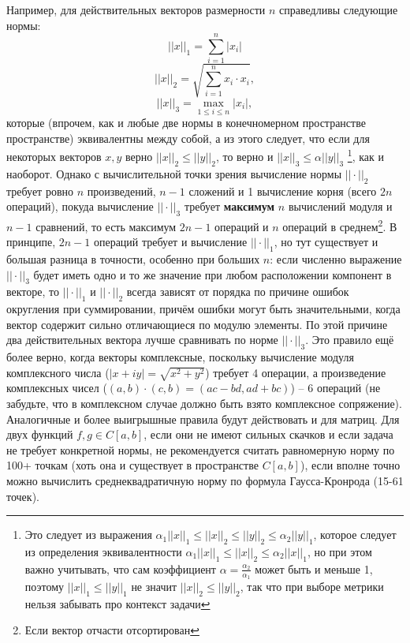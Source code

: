 \documentclass[a4paper, 12pt]{article}
\begin{document}
Например, для действительных векторов размерности $n$ справедливы следующие нормы:
\begin{equation}
    ||x||_1=\sum_{i=1}^n |x_i|
\end{equation}
\begin{equation}
    ||x||_2=\sqrt{\sum_{i=1}^n x_i \cdot x_i},  
\end{equation}
\begin{equation}
    ||x||_3=\max_{1\leq i \leq n} |x_i|,
\end{equation}
которые (впрочем, как и любые две нормы в конечномерном пространстве пространстве) эквивалентны между собой, а из этого следует, что если для некоторых векторов $x,y$ верно $||x||_2 \leq ||y||_2$, то верно и $||x||_3 \leq \alpha ||y||_3$ \footnote{Это следует из выражения $\alpha_1 ||x||_1 \leq ||x||_2\leq||y||_2\leq \alpha_2 ||y||_1$, которое следует из определения эквивалентности $\alpha_1 ||x||_1 \leq ||x||_2\leq \alpha_2 ||x||_1$, но при этом важно учитывать, что сам коэффициент $\alpha=\frac{\alpha_2}{\alpha_1}$ может быть и меньше 1, поэтому $||x||_1\leq ||y||_1$ не значит $||x||_2\leq ||y||_2$, так что при выборе метрики нельзя забывать про контекст задачи}, как и наоборот.
Однако с вычислительной точки зрения вычисление нормы $||\cdot||_2$ требует ровно $n$ произведений, $n-1$ сложений и 1 вычисление корня (всего $2n$ операций), покуда вычисление $||\cdot||_3$ требует {\bf максимум} $n$ вычислений модуля и $n-1$ сравнений, то есть максимум $2n-1$ операций и $n$ операций в среднем\footnote{Если вектор отчасти отсортирован}. В принципе, $2n-1$ операций требует и вычисление $||\cdot||_1$, но тут существует и большая разница в точности, особенно при больших $n$: если численно выражение $||\cdot||_3$ будет иметь одно и то же значение при любом расположении компонент в векторе, то $||\cdot||_1$ и $||\cdot||_2$ всегда зависят от порядка по причине ошибок округления при суммировании, причём ошибки могут быть значительными, когда вектор содержит сильно отличающиеся по модулю элементы. По этой причине два действительных вектора лучше сравнивать по норме $||\cdot||_3$.
Это правило ещё более верно, когда векторы комплексные, поскольку вычисление модуля комплексного числа ($|x+iy|=\sqrt{x^2+y^2}$) требует 4 операции, а произведение комплексных чисел ($(a,b)\cdot(c,b)=(ac-bd,ad+bc)$) -- 6 операций (не забудьте, что в комплексном случае должно быть взято комплексное сопряжение). Аналогичные и более выигрышные правила будут действовать и для матриц.
Для двух функций $f,g \in C[a,b]$, если они не имеют сильных скачков и если задача не требует конкретной нормы, не рекомендуется считать равномерную норму по 100+ точкам (хоть она и существует в пространстве $C[a,b]$), если вполне точно можно вычислить среднеквадратичную норму по формула Гаусса-Кронрода (15-61 точек).
\end{document}
